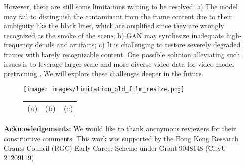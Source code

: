 \documentclass[10pt,twocolumn,letterpaper]{article}
\begin{document}
However, there are still some limitations waiting to be resolved: a) The model may fail to distinguish the contaminant from the frame content due to their ambiguity like the black lines, which are amplified since they are wrongly recognized as the smoke of the scene; b) GAN may synthesize inadequate high-frequency details and artifacts; c) It is challenging to restore severely degraded frames with barely recognizable content. One possible solution alleviating such issues is to leverage larger scale and more diverse video data for video model pretraining \cite{wang2021bevt}. We will explore these challenges deeper in the future. 
	
	\begin{figure}[!h]
		\begin{center}
			\scriptsize
\texttt{[image: images/limitation\_old\_film\_resize.png]}
\renewcommand{\tabcolsep}{36pt}
			\renewcommand{\arraystretch}{0.6}
			\begin{tabular}{@{}ccc@{}}
				(a) & (b) & (c)
			\end{tabular}
\label{fig:limitation}
		\end{center}
	\end{figure}
\noindent\textbf{Acknowledgements: }We would like to thank anonymous reviewers for their constructive comments. This work was supported by the Hong Kong Research Grants Council (RGC) Early Career Scheme under Grant 9048148 (CityU 21209119).
	
{\small
		
		
	}
	
\end{document}
